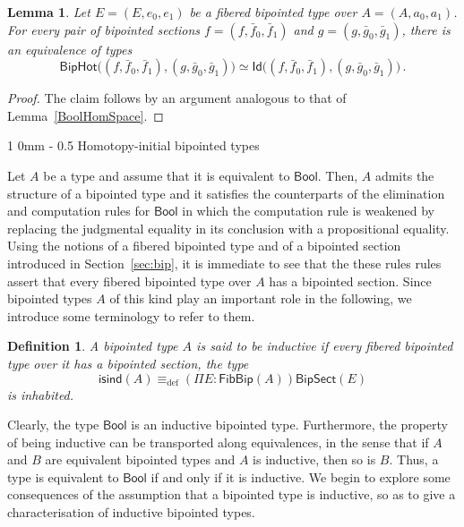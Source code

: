 \documentclass[10pt,a4paper,oneside,reqno]{amsart}
\makeatletter
\numberwithin{equation}{section}
\renewcommand{\section}{\@startsection
  {section}%
   {1}%
  {0mm}%
   {-\baselineskip}%
  {0.5\baselineskip}%
   {\Large\bfseries}}%
\theoremstyle{mythm}
\newtheorem{lemma}[theorem]{Lemma}
\theoremstyle{mydef}
\newtheorem{definition}[theorem]{Definition}
\theoremstyle{myrmk}
\newcommand{\ie}{\text{i.e.\ }}
\newcommand{\deq}{\equiv}
\newcommand{\defeq}{\deq_{\mathrm{def}}}
\newcommand{\Id}{\mathsf{Id}}
\newcommand{\Bool}{\mathsf{Bool}}
\newcommand{\FibBip}{\mathsf{FibBip}}
\newcommand{\BipSect}{\mathsf{BipSect}}
\newcommand{\isind}{\mathsf{isind}}
\newcommand{\BipHot}{\mathsf{BipHot}}
\makeatother
\begin{document}
\begin{lemma} Let $E = (E, e_0, e_1)$ be a fibered bipointed type over $A = (A, a_0, a_1)$. 
For every pair of bipointed sections $f = (f, \bar{f}_0, \bar{f}_1)$ and $g = (g, \bar{g}_0, \bar{g}_1)$, 
there is an equivalence of types
\[
\BipHot \big( (f, \bar{f}_0, \bar{f}_1), (g, \bar{g}_0, \bar{g}_1) \big)
\simeq 
\Id\big( (f, \bar{f}_0, \bar{f}_1), (g, \bar{g}_0, \bar{g}_1) \big) \, .
\]
\end{lemma}


\begin{proof} The claim follows by an argument analogous to that of Lemma~\ref{BoolHomSpace}.
\end{proof}







\section{Homotopy-initial bipointed types} 



Let $A$ be a type and assume that it is equivalent to $\Bool$. Then, $A$ admits the structure of a bipointed type and
it satisfies the counterparts of the elimination and computation rules for $\Bool$ in which the computation rule is 
weakened by replacing the judgmental equality in its conclusion with a propositional equality. Using the notions of a fibered bipointed type and of a bipointed section introduced in Section~\ref{sec:bip}, it is immediate to see that the these rules rules assert that every fibered bipointed type over $A$ has a bipointed section. Since bipointed types $A$ of this kind  play an important role in the following, we introduce some terminology to refer to them.


 



\begin{definition} A bipointed type $A$ is said to be \emph{inductive} if every fibered bipointed type over it has a bipointed section, \ie the type
\[ 
\isind(A) \defeq (\Pi E : \FibBip(A))  \BipSect(E)
\]  
is inhabited. \end{definition} 



Clearly, the type $\Bool$ is an inductive bipointed type. Furthermore, the property of being inductive can be transported along equivalences, in the sense that if $A$ and $B$ are equivalent bipointed types and $A$ is inductive, then so is $B$. Thus, a
type is equivalent to $\Bool$ if and only if it is inductive.
We begin to explore some consequences of the assumption that a bipointed type is inductive, so as to give a 
characterisation of inductive bipointed types.
\end{document}
